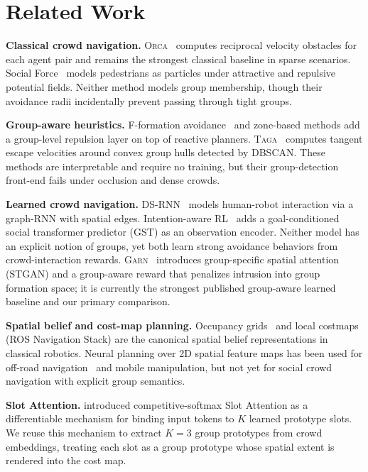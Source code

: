 \documentclass{article}
\newcommand{\garn}{\textsc{Garn}}
\newcommand{\taga}{\textsc{Taga}}
\newcommand{\orca}{\textsc{Orca}}
\begin{document}
\section{Related Work}
\label{sec:related}

\textbf{Classical crowd navigation.}
\orca{}~\citep{vandenberg2011reciprocal} computes reciprocal velocity obstacles
for each agent pair and remains the strongest classical baseline in sparse
scenarios. Social Force~\citep{helbing1995social} models pedestrians as
particles under attractive and repulsive potential fields. Neither method
models group membership, though their avoidance radii incidentally prevent
passing through tight groups.

\textbf{Group-aware heuristics.}
F-formation avoidance~\citep{kendon1990conducting} and zone-based methods add
a group-level repulsion layer on top of reactive planners. \taga{}~\citep{roy2025taga}
computes tangent escape velocities around convex group hulls detected by DBSCAN.
These methods are interpretable and require no training, but their group-detection
front-end fails under occlusion and dense crowds.

\textbf{Learned crowd navigation.}
DS-RNN~\citep{liu2021decentralized} models human-robot interaction via a
graph-RNN with spatial edges. Intention-aware RL~\citep{liu2022intention}
adds a goal-conditioned social transformer predictor (GST) as an observation
encoder. Neither model has an explicit notion of groups, yet both learn strong
avoidance behaviors from crowd-interaction rewards.
\garn{}~\citep{lu2025garn} introduces group-specific spatial attention
(STGAN) and a group-aware reward that penalizes intrusion into group formation
space; it is currently the strongest published group-aware learned baseline and
our primary comparison.

\textbf{Spatial belief and cost-map planning.}
Occupancy grids~\citep{elfes1989using} and local costmaps (ROS Navigation Stack)
are the canonical spatial belief representations in classical robotics. Neural
planning over 2D spatial feature maps has been used for
off-road navigation~\citep{loquercio2023learning} and mobile manipulation, but
not yet for social crowd navigation with explicit group semantics.

\textbf{Slot Attention.}
\cite{locatello2020object} introduced competitive-softmax Slot Attention as a
differentiable mechanism for binding input tokens to $K$ learned prototype
slots. We reuse this mechanism to extract $K=3$ group prototypes from
crowd embeddings, treating each slot as a group prototype whose spatial extent
is rendered into the cost map.
\end{document}
